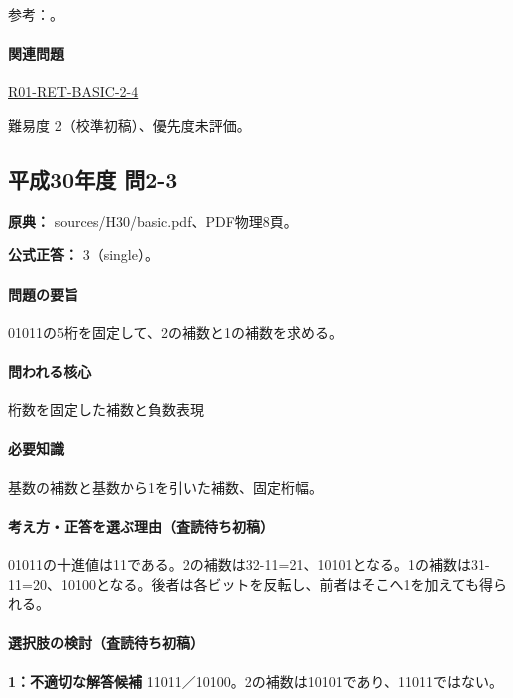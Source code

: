 \par 参考：\cite{oracle_single}。

\paragraph{関連問題} \hyperref[q:r01-ret-basic-2-4]{R01-RET-BASIC-2-4}

\par 難易度 2（校準初稿）、優先度未評価。

\subsection{平成30年度 問2-3}
\label{q:h30-reg-basic-2-3}

\noindent\textbf{原典：} sources/H30/basic.pdf、PDF物理8頁。

\textbf{公式正答：} 3（single）。

\paragraph{問題の要旨} 01011の5桁を固定して、2の補数と1の補数を求める。

\paragraph{問われる核心} 桁数を固定した補数と負数表現

\paragraph{必要知識} 基数の補数と基数から1を引いた補数、固定桁幅。

\paragraph{考え方・正答を選ぶ理由（査読待ち初稿）} 01011の十進値は11である。2の補数は32-11=\allowbreak{}21、10101となる。1の補数は31-11=\allowbreak{}20、10100となる。後者は各ビットを反転し、前者はそこへ1を加えても得られる。

\paragraph{選択肢の検討（査読待ち初稿）}\mbox{}\par

\noindent\textbf{1：不適切な解答候補} 11011／10100。2の補数は10101であり、11011ではない。\par

